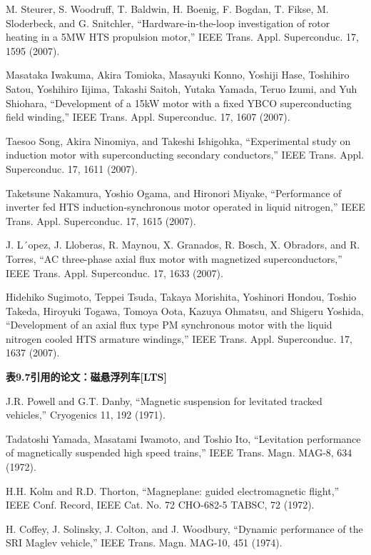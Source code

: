 \noindent [9.228] M. Steurer, S. Woodruff, T. Baldwin, H. Boenig, F. Bogdan, T. Fikse, M. Sloderbeck,
and G. Snitchler, ``Hardware-in-the-loop investigation of rotor heating in a
5MW HTS propulsion motor,” IEEE Trans. Appl. Superconduc. 17, 1595 (2007).

\noindent [9.229] Masataka Iwakuma, Akira Tomioka, Masayuki Konno, Yoshiji Hase, Toshihiro
Satou, Yoshihiro Iijima, Takashi Saitoh, Yutaka Yamada, Teruo Izumi, and Yuh
Shiohara, ``Development of a 15kW motor with a fixed YBCO superconducting
field winding,” IEEE Trans. Appl. Superconduc. 17, 1607 (2007).

\noindent [9.230] Taesoo Song, Akira Ninomiya, and Takeshi Ishigohka, ``Experimental study on
induction motor with superconducting secondary conductors,” IEEE Trans. Appl.
Superconduc. 17, 1611 (2007).

\noindent [9.231] Taketsune Nakamura, Yoshio Ogama, and Hironori Miyake, ``Performance of inverter
fed HTS induction-synchronous motor operated in liquid nitrogen,” IEEE
Trans. Appl. Superconduc. 17, 1615 (2007).

\noindent [9.232] J. L´opez, J. Lloberas, R. Maynou, X. Granados, R. Bosch, X. Obradors, and
R. Torres, ``AC three-phase axial flux motor with magnetized superconductors,”
IEEE Trans. Appl. Superconduc. 17, 1633 (2007).

\noindent [9.233] Hidehiko Sugimoto, Teppei Tsuda, Takaya Morishita, Yoshinori Hondou, Toshio
Takeda, Hiroyuki Togawa, Tomoya Oota, Kazuya Ohmatsu, and Shigeru Yoshida,
``Development of an axial flux type PM synchronous motor with the liquid nitrogen
cooled HTS armature windings,” IEEE Trans. Appl. Superconduc. 17, 1637
(2007).

\noindent \textbf{表9.7引用的论文：磁悬浮列车[LTS] }

\noindent [9.234] J.R. Powell and G.T. Danby, ``Magnetic suspension for levitated tracked vehicles,”
Cryogenics 11, 192 (1971).

\noindent [9.235] Tadatoshi Yamada, Masatami Iwamoto, and Toshio Ito, ``Levitation performance
of magnetically suspended high speed trains,” IEEE Trans. Magn. MAG-8, 634
(1972).

\noindent [9.236] H.H. Kolm and R.D. Thorton, ``Magneplane: guided electromagnetic flight,” IEEE
Conf. Record, IEEE Cat. No. 72 CHO-682-5 TABSC, 72 (1972).

\noindent [9.237] H. Coffey, J. Solinsky, J. Colton, and J. Woodbury, ``Dynamic performance of the
SRI Maglev vehicle,” IEEE Trans. Magn. MAG-10, 451 (1974).

